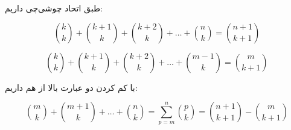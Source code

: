 \p		
طبق اتحاد چوشی‌چی داریم:

\[
\binom{k}{k} + \binom{k + 1}{k} + \binom{k + 2}{k} +\ldots +
\binom{n}{k} = \binom{n + 1}{k + 1}
\]

\[
\binom{k}{k} + \binom{k + 1}{k} + \binom{k + 2}{k} +\ldots +
\binom{m - 1}{k} = \binom{m}{k + 1}
\]

با کم کردن دو عبارت بالا از هم داریم:

\[
\binom{m}{k} + \binom{m + 1}{k} +\ldots +
\binom{n}{k} = \sum\limits_{p=m}^{n}\binom{p}{k} = \binom{n + 1}{k + 1} - \binom{m}{k + 1}
\]